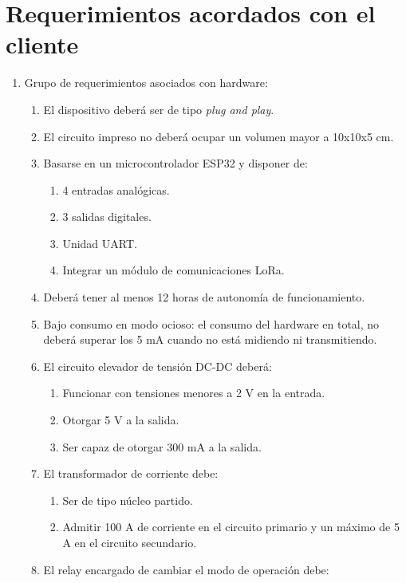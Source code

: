 \section{Requerimientos acordados con el cliente}
\label{sec:requerimientos}
\begin{enumerate}
	\item Grupo de requerimientos asociados con hardware:
	\begin{enumerate}
		\item El dispositivo deberá ser de tipo \textit{plug and play}.
		\item El circuito impreso no deberá ocupar un volumen mayor a 10x10x5 cm.
		\item Basarse en un microcontrolador ESP32 y disponer de:
		\begin{enumerate}%
			\item 4 entradas analógicas.
			\item 3 salidas digitales.
			\item Unidad UART.
			\item Integrar un módulo de comunicaciones LoRa.
		\end{enumerate}
		\item Deberá tener al menos 12 horas de autonomía de funcionamiento.
		\item Bajo consumo en modo ocioso: el consumo del hardware en total, no deberá superar los 5 mA cuando no está midiendo ni transmitiendo.
		\item El circuito elevador de tensión DC-DC deberá:
		\begin{enumerate}%
			\item Funcionar con tensiones menores a 2 V en la entrada.
			\item Otorgar 5 V a la salida.
			\item Ser capaz de otorgar 300 mA a la salida.
		\end{enumerate}
		\item El transformador de corriente debe:\label{requerimientos_corriente_ti}
		\begin{enumerate}%
			\item Ser de tipo núcleo partido.
			\item Admitir 100 A de corriente en el circuito primario y un máximo de 5 A en el circuito secundario.
		\end{enumerate}
		\item \label{req_relay} El relay encargado de cambiar el modo de operación debe:
		\begin{enumerate}%

\end{enumerate}
\end{enumerate}
\end{enumerate}
